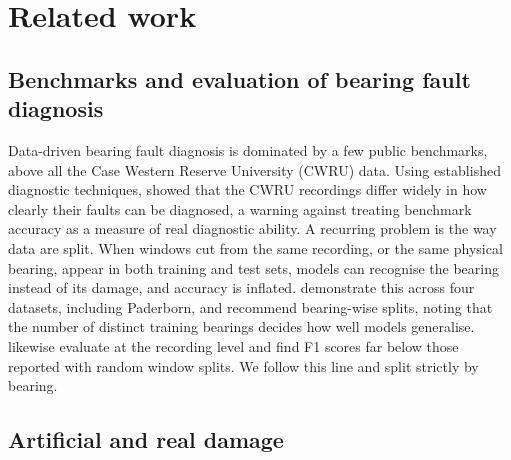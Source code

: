 \section{Related work}
\label{sec:related}

\subsection{Benchmarks and evaluation of bearing fault diagnosis}

Data-driven bearing fault diagnosis is dominated by a few public benchmarks, above all the Case Western Reserve
University (CWRU) data. Using established diagnostic techniques, \citet{smith2015} showed that the CWRU recordings
differ widely in how clearly their faults can be diagnosed, a warning against treating benchmark accuracy as a
measure of real diagnostic ability. A recurring problem is the way data are split. When windows cut from the same
recording, or the same physical bearing, appear in both training and test sets, models can recognise the bearing
instead of its damage, and accuracy is inflated. \citet{vieira2026} demonstrate this across four datasets, including
Paderborn, and recommend bearing-wise splits, noting that the number of distinct training bearings decides how well
models generalise. \citet{gonzalezgarcia2026} likewise evaluate at the recording level and find F1 scores far below
those reported with random window splits. We follow this line and split strictly by bearing.

\subsection{Artificial and real damage}

